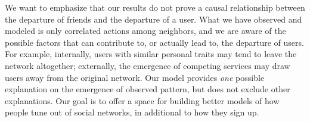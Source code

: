 \documentclass[phd,tocprelim]{cornell}
\begin{document}
We want to emphasize that our results do not prove a causal relationship between the departure of friends and the departure of a user. What we have observed and modeled is only correlated actions among neighbors, and we are aware of the possible factors that can contribute to, or actually lead to, the departure of users. For example, internally, users with similar personal traits may tend to leave the network altogether; externally, the emergence of competing services may draw users away from the original network. Our model provides \emph{one} possible explanation on the emergence of observed pattern, but does not exclude other explanations. Our goal is to offer a space for building better models of how people tune out of social networks, in additional to how they sign up. 



% 





\end{document}
